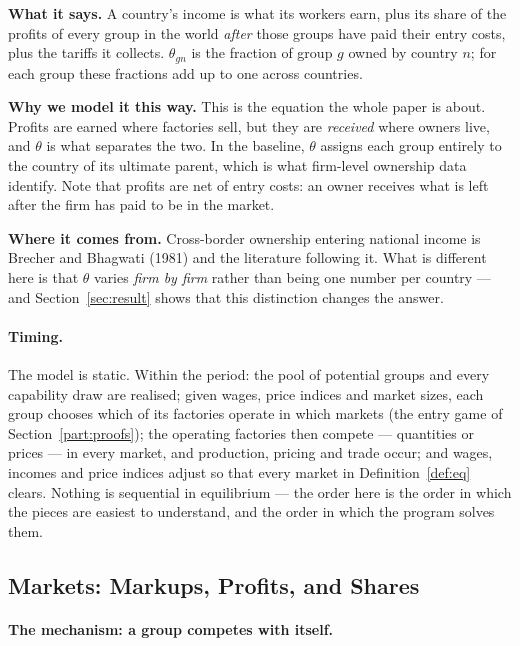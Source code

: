 \documentclass[11pt]{article}
\newcommand{\says}[1]{\smallskip\noindent\textbf{What it says.} #1\smallskip}
\newcommand{\why}[1]{\smallskip\noindent\textbf{Why we model it this way.} #1\smallskip}
\newcommand{\from}[1]{\smallskip\noindent\textbf{Where it comes from.} #1\smallskip}
\theoremstyle{plain}
\theoremstyle{remark}
\theoremstyle{definition}
\begin{document}
\says{A country's income is what its workers earn, plus its share of the profits of
every group in the world \emph{after} those groups have paid their entry costs, plus
the tariffs it collects. $\theta_{gn}$ is the fraction of group $g$ owned by country
$n$; for each group these fractions add up to one across countries.}

\why{This is the equation the whole paper is about. Profits are earned where factories
sell, but they are \emph{received} where owners live, and $\theta$ is what separates
the two. In the baseline, $\theta$ assigns each group entirely to the country of its
ultimate parent, which is what firm-level ownership data identify. Note that profits
are net of entry costs: an owner receives what is left after the firm has paid to be
in the market.}

\from{Cross-border ownership entering national income is Brecher and Bhagwati (1981)
and the literature following it. What is different here is that $\theta$ varies
\emph{firm by firm} rather than being one number per country --- and Section~\ref{sec:result} shows
that this distinction changes the answer.}

\paragraph{Timing.} The model is static. Within the period: the pool of
potential groups and every capability draw are realised; given wages, price indices
and market sizes, each group chooses which of its factories operate in which markets
(the entry game of Section~\ref{part:proofs}); the operating factories then compete
--- quantities or prices --- in every market, and production, pricing and trade
occur; and wages, incomes and price indices adjust so that every market in
Definition~\ref{def:eq} clears. Nothing is sequential in equilibrium --- the order
here is the order in which the pieces are easiest to understand, and the order in
which the program solves them.

\subsection{Markets: Markups, Profits, and Shares}

\paragraph{The mechanism: a group competes with itself.}
\label{sec:cannibal}
\end{document}
